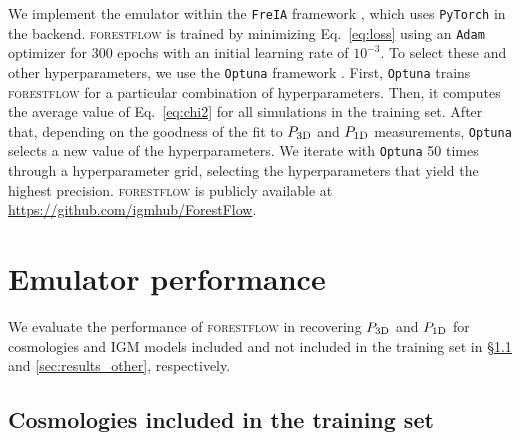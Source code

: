 \documentclass[fleqn,usenatbib]{mnras}
\newcommand{\poned}{\ensuremath{P_{\rm 1D}}\xspace}
\newcommand{\pthreed}{\ensuremath{P_{\rm 3D}}\xspace}
\newcommand{\forestflow}{\textsc{forestflow}\xspace}
\begin{document}
We implement the emulator within the \texttt{FreIA} framework \citep{freia}, which uses \texttt{PyTorch} \citep{paszke2017automatic} in the backend.  \forestflow is trained by minimizing Eq.~\ref{eq:loss} using an \texttt{Adam} optimizer \citep{adam_Diederik2015} for 300 epochs with an initial learning rate of $10^{-3}$. To select these and other hyperparameters, we use the \texttt{Optuna} framework \citep{optuna_2019}. First, \texttt{Optuna} trains \forestflow for a particular combination of hyperparameters. Then, it computes the average value of Eq.~\ref{eq:chi2} for all simulations in the training set. After that, depending on the goodness of the fit to \pthreed and \poned measurements, \texttt{Optuna} selects a new value of the hyperparameters. We iterate with \texttt{Optuna} 50 times through a hyperparameter grid, selecting the hyperparameters that yield the highest precision. \forestflow is publicly available at \url{https://github.com/igmhub/ForestFlow}.


\section{Emulator performance}
\label{sec:results}

We evaluate the performance of \forestflow in recovering \pthreed and \poned for cosmologies and IGM models included and not included in the training set in \S\ref{sec:results_statistics} and \ref{sec:results_other}, respectively.


\subsection{Cosmologies included in the training set}
\label{sec:results_statistics}
\end{document}

